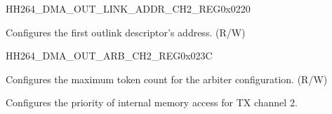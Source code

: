 \begin{register}{H}{H264\_DMA\_OUT\_LINK\_ADDR\_CH2\_REG}{0x0220}\label{regdesc:H264DMAOUTLINKADDRCH2REG}
%
\regnewline%
\begin{regdesc}\begin{reglist}
\label{fielddesc:H264DMAOUTLINKADDRCH2}\item [H264\_DMA\_OUTLINK\_ADDR\_CH2] Configures the first outlink descriptor's address. (R/W)
\end{reglist}\end{regdesc}
\end{register}


\begin{register}{H}{H264\_DMA\_OUT\_ARB\_CH2\_REG}{0x023C}\label{regdesc:H264DMAOUTARBCH2REG}
%
%
%
%
\regnewline%
\begin{regdesc}\begin{reglist}
\label{fielddesc:H264DMAOUTARBTOKENNUMCH2}\item [H264\_DMA\_OUT\_ARB\_TOKEN\_NUM\_CH2] Configures the maximum token count for the arbiter configuration. (R/W)
\label{fielddesc:H264DMAINTEROUTARBPRIORITYCH2}\item [H264\_DMA\_INTER\_OUT\_ARB\_PRIORITY\_CH2] Configures the priority of internal memory access for TX channel 2.
\end{reglist}\end{regdesc}
\end{register}



